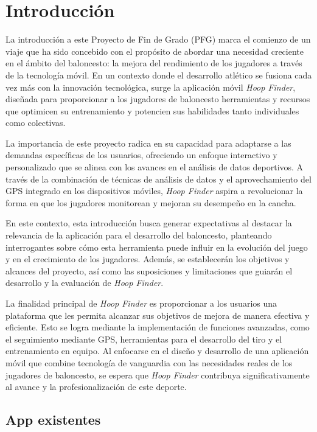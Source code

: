 \chapter{Introducción}
\label{ch:introduccion}

La introducción a este Proyecto de Fin de Grado (PFG) marca el comienzo de un viaje que ha sido concebido con el propósito de abordar una necesidad creciente en el ámbito del baloncesto: la mejora del rendimiento de los jugadores a través de la tecnología móvil. En un contexto donde el desarrollo atlético se fusiona cada vez más con la innovación tecnológica, surge la aplicación móvil \textit{Hoop Finder}, diseñada para proporcionar a los jugadores de baloncesto herramientas y recursos que optimicen su entrenamiento y potencien sus habilidades tanto individuales como colectivas.

La importancia de este proyecto radica en su capacidad para adaptarse a las demandas específicas de los usuarios, ofreciendo un enfoque interactivo y personalizado que se alinea con los avances en el análisis de datos deportivos. A través de la combinación de técnicas de análisis de datos y el aprovechamiento del GPS integrado en los dispositivos móviles, \textit{Hoop Finder} aspira a revolucionar la forma en que los jugadores monitorean y mejoran su desempeño en la cancha.

En este contexto, esta introducción busca generar expectativas al destacar la relevancia de la aplicación para el desarrollo del baloncesto, planteando interrogantes sobre cómo esta herramienta puede influir en la evolución del juego y en el crecimiento de los jugadores. Además, se establecerán los objetivos y alcances del proyecto, así como las suposiciones y limitaciones que guiarán el desarrollo y la evaluación de \textit{Hoop Finder}.

La finalidad principal de \textit{Hoop Finder} es proporcionar a los usuarios una plataforma que les permita alcanzar sus objetivos de mejora de manera efectiva y eficiente. Esto se logra mediante la implementación de funciones avanzadas, como el seguimiento mediante GPS, herramientas para el desarrollo del tiro y el entrenamiento en equipo. Al enfocarse en el diseño y desarrollo de una aplicación móvil que combine tecnología de vanguardia con las necesidades reales de los jugadores de baloncesto, se espera que \textit{Hoop Finder} contribuya significativamente al avance y la profesionalización de este deporte.

\section{App existentes}

